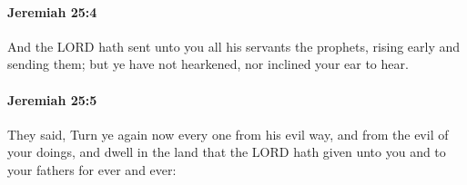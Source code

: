 		\paragraph{Jeremiah 25:4} %
			\label{JEREMIAH-25-4}

			And the LORD hath sent unto you all his servants the prophets, rising early and sending them; but ye have not hearkened, nor inclined your ear to hear.


		\paragraph{Jeremiah 25:5} %
			\label{JEREMIAH-25-5}

			They said, Turn ye again now every one from his evil way, and from the evil of your doings, and dwell in the land that the LORD hath given unto you and to your fathers for ever and ever:



